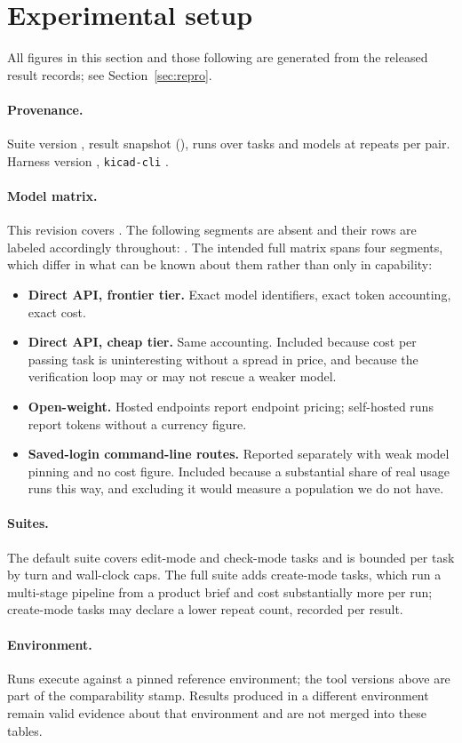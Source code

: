 \section{Experimental setup}
\label{sec:setup}

All figures in this section and those following are generated from the released result records; see Section~\ref{sec:repro}.

\paragraph{Provenance.} Suite version \suiteVersion{}, result snapshot \snapshotId{} (\snapshotSha{}), \recordCount{} runs over \taskCount{} tasks and \modelCount{} models at \repeatCount{} repeats per pair. Harness version \copperheadVersion{}, \texttt{kicad-cli} \kicadCliVersion{}.

\paragraph{Model matrix.} This revision covers \segmentsCovered{}. The following segments are absent and their rows are labeled accordingly throughout: \segmentsAbsent{}. The intended full matrix spans four segments, which differ in what can be known about them rather than only in capability:

\begin{itemize}
  \item \textbf{Direct API, frontier tier.} Exact model identifiers, exact token accounting, exact cost.
  \item \textbf{Direct API, cheap tier.} Same accounting. Included because cost per passing task is uninteresting without a spread in price, and because the verification loop may or may not rescue a weaker model.
  \item \textbf{Open-weight.} Hosted endpoints report endpoint pricing; self-hosted runs report tokens without a currency figure.
  \item \textbf{Saved-login command-line routes.} Reported separately with weak model pinning and no cost figure. Included because a substantial share of real usage runs this way, and excluding it would measure a population we do not have.
\end{itemize}

\paragraph{Suites.} The default suite covers edit-mode and check-mode tasks and is bounded per task by turn and wall-clock caps. The full suite adds create-mode tasks, which run a multi-stage pipeline from a product brief and cost substantially more per run; create-mode tasks may declare a lower repeat count, recorded per result.

\paragraph{Environment.} Runs execute against a pinned reference environment; the tool versions above are part of the comparability stamp. Results produced in a different environment remain valid evidence about that environment and are not merged into these tables.
